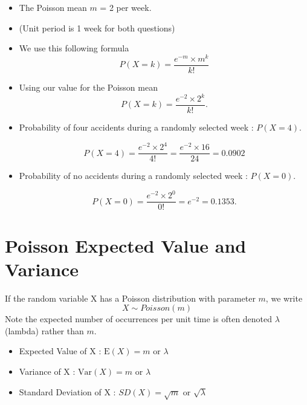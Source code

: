 \documentclass[a4paper,12pt]{article}
\begin{document}
\begin{itemize}
	\item The Poisson mean $m$ = 2  per week.
	\item (Unit period is 1 week for both questions)
	\item We use this following formula
	\[ P(X=k) =  \frac{e^{-m} \times m ^k}{k!}  \]
	\item Using our value for the Poisson mean
	\[ P(X=k) =  \frac{e^{-2} \times 2^k}{k!} . \]
	
	\item Probability of four accidents during a randomly selected week : $ P(X = 4)$.
	
	\[ P(X=4) =  \frac{e^{-2} \times 2^4}{4!} = \frac{e^{-2} \times 16}{24} = 0.0902\]
	
	\item Probability of no accidents during a randomly selected week : $ P(X = 0)$.
	
	\[ P(X=0) =  \frac{e^{-2} \times 2^0}{0!} = e^{-2} = 0.1353. \]
	
	
\end{itemize}



\newpage
\section*{Poisson Expected Value and Variance}


If the random variable X has a Poisson distribution with parameter $m$, we write
\[ X \sim Poisson(m) \]
Note the expected number of occurrences per unit time is often denoted $\lambda$ (lambda) rather than $m$.

% 




\begin{itemize}
	\item Expected Value of X : $\mbox{E}(X)=  m \mbox{ or } \lambda$
	\item Variance of X : $\mbox{Var}(X) = m \mbox{ or } \lambda$
	\item Standard Deviation of X : $SD(X) = \sqrt{m} \mbox{ or } \sqrt{\lambda}$
\end{itemize}
\end{document}

